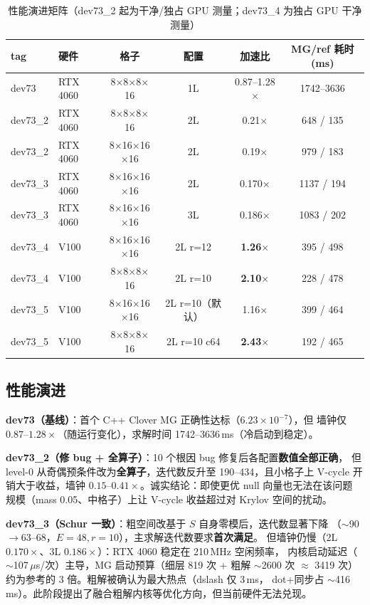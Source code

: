 \documentclass[11pt,a4paper]{article}
\begin{document}
\begin{table}[H]
\centering
\small
\begin{tabular}{llcccc}
\toprule
tag & 硬件 & 格子 & 配置 & 加速比 & MG/ref 耗时(ms) \\
\midrule
dev73   & RTX 4060 & 8$\times$8$\times$8$\times$16 & 1L & 0.87--1.28$\times$ & 1742--3636 \\
dev73\_2 & RTX 4060 & 8$\times$8$\times$8$\times$16 & 2L & 0.21$\times$ & 648 / 135 \\
dev73\_2 & RTX 4060 & 8$\times$16$\times$16$\times$16 & 2L & 0.19$\times$ & 979 / 183 \\
dev73\_3 & RTX 4060 & 8$\times$16$\times$16$\times$16 & 2L & 0.170$\times$ & 1137 / 194 \\
dev73\_3 & RTX 4060 & 8$\times$16$\times$16$\times$16 & 3L & 0.186$\times$ & 1083 / 202 \\
dev73\_4 & V100     & 8$\times$16$\times$16$\times$16 & 2L r=12 & \textbf{1.26$\times$} & 395 / 498 \\
dev73\_4 & V100     & 8$\times$8$\times$8$\times$16 & 2L r=10 & \textbf{2.10$\times$} & 228 / 478 \\
dev73\_5 & V100     & 8$\times$16$\times$16$\times$16 & 2L r=10（默认） & 1.16$\times$ & 399 / 464 \\
dev73\_5 & V100     & 8$\times$8$\times$8$\times$16 & 2L r=10 c64 & \textbf{2.43$\times$} & 192 / 465 \\
\bottomrule
\end{tabular}
\caption{性能演进矩阵（dev73\_2 起为干净/独占 GPU 测量；dev73\_4 为独占 GPU 干净测量）}
\end{table}

\subsection{性能演进}
\label{sec:perf-evolution}

\textbf{dev73（基线）}：首个 C++ Clover MG 正确性达标（$6.23\times10^{-7}$），但
墙钟仅 $0.87$--$1.28\times$（随运行变化），求解时间 1742--3636\,ms（冷启动到稳定）。

\textbf{dev73\_2（修 bug + 全算子）}：10 个根因 bug 修复后各配置\textbf{数值全部正确}，
但 level-0 从奇偶预条件改为\textbf{全算子}，迭代数反升至 190--434，且小格子上 V-cycle
开销大于收益，墙钟 $0.15$--$0.41\times$。诚实结论：即使更优 null 向量也无法在该问题
规模（mass 0.05、中格子）上让 V-cycle 收益超过对 Krylov 空间的扰动。

\textbf{dev73\_3（Schur 一致）}：粗空间改基于 $S$ 自身零模后，迭代数显著下降
（$\sim$90$\to$63--68，$E{=}48,r{=}10$），主求解迭代数要求\textbf{首次满足}。
但墙钟仍慢（2L $0.170\times$、3L $0.186\times$）：RTX 4060 稳定在 210\,MHz 空闲频率，
内核启动延迟（$\sim$107\,$\mu$s/次）主导，MG 启动预算（细层 819 次 + 粗解 $\sim$2600 次
$\approx$ 3419 次）约为参考的 3 倍。粗解被确认为最大热点（dslash 仅 3\,ms，
dot+同步占 $\sim$416\,ms）。此阶段提出了融合粗解内核等优化方向，但当前硬件无法兑现。
\end{document}
